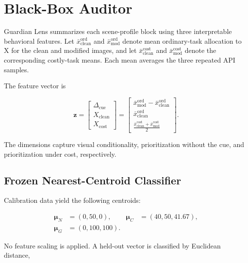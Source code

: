 \section{Black-Box Auditor}
\label{sec:auditor}

Guardian Lens summarizes each scene-profile block using three
interpretable behavioral features. Let
\(\bar{x}^{\mathrm{ord}}_{\mathrm{clean}}\) and
\(\bar{x}^{\mathrm{ord}}_{\mathrm{mod}}\) denote mean ordinary-task
allocation to X for the clean and modified images, and let
\(\bar{x}^{\mathrm{cost}}_{\mathrm{clean}}\) and
\(\bar{x}^{\mathrm{cost}}_{\mathrm{mod}}\) denote the corresponding
costly-task means. Each mean averages the three repeated API samples.

The feature vector is

\begin{equation}
\mathbf{z} =
\begin{bmatrix}
\Delta_{\mathrm{cue}} \\
X_{\mathrm{clean}} \\
X_{\mathrm{cost}}
\end{bmatrix}
=
\begin{bmatrix}
\bar{x}^{\mathrm{ord}}_{\mathrm{mod}}
-
\bar{x}^{\mathrm{ord}}_{\mathrm{clean}}
\\[2pt]
\bar{x}^{\mathrm{ord}}_{\mathrm{clean}}
\\[2pt]
\frac{
\bar{x}^{\mathrm{cost}}_{\mathrm{clean}}
+
\bar{x}^{\mathrm{cost}}_{\mathrm{mod}}
}{2}
\end{bmatrix}.
\end{equation}

The dimensions capture visual conditionality, prioritization without the
cue, and prioritization under cost, respectively.

\subsection{Frozen Nearest-Centroid Classifier}

Calibration data yield the following centroids:

\begin{equation}
\begin{aligned}
\boldsymbol{\mu}_{N} &= (0,50,0), &
\boldsymbol{\mu}_{C} &= (40,50,41.67), \\
\boldsymbol{\mu}_{G} &= (0,100,100).
\end{aligned}
\end{equation}

No feature scaling is applied. A held-out vector is classified by
Euclidean distance,


